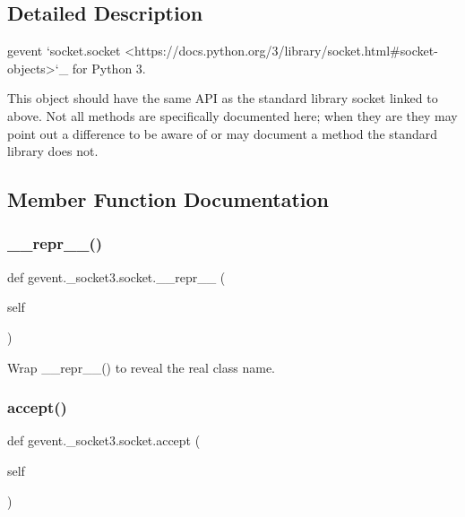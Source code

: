 \subsection{Detailed Description}
\begin{DoxyVerb}gevent `socket.socket <https://docs.python.org/3/library/socket.html#socket-objects>`_
for Python 3.

This object should have the same API as the standard library socket linked to above. Not all
methods are specifically documented here; when they are they may point out a difference
to be aware of or may document a method the standard library does not.
\end{DoxyVerb}
 

\subsection{Member Function Documentation}
\mbox{\label{classgevent_1_1__socket3_1_1socket_af7d8a881006707e5f430633451590076}} 
\subsubsection{\texorpdfstring{\+\_\+\+\_\+repr\+\_\+\+\_\+()}{\_\_repr\_\_()}}
{\footnotesize\ttfamily def gevent.\+\_\+socket3.\+socket.\+\_\+\+\_\+repr\+\_\+\+\_\+ (\begin{DoxyParamCaption}\item[{}]{self }\end{DoxyParamCaption})}

\begin{DoxyVerb}Wrap __repr__() to reveal the real class name.\end{DoxyVerb}
 \mbox{\label{classgevent_1_1__socket3_1_1socket_a651a6acb24b19f45b771aa7523879ea2}} 
\subsubsection{\texorpdfstring{accept()}{accept()}}
{\footnotesize\ttfamily def gevent.\+\_\+socket3.\+socket.\+accept (\begin{DoxyParamCaption}\item[{}]{self }\end{DoxyParamCaption})}

